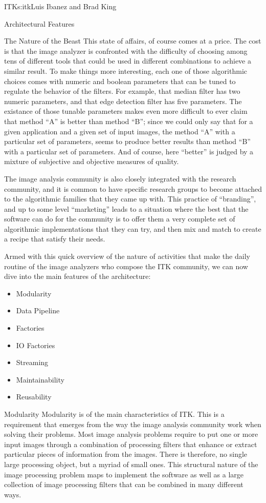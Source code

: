 \begin{aosachapter}{ITK}{s:itk}{Luis Ibanez and Brad King}
\begin{aosasect1}{Architectural Features}
\begin{aosasect2}{The Nature of the Beast}
This state of affairs, of course comes at a price. The cost is that the image
analyzer is confronted with the difficulty of choosing among tens of different
tools that could be used in different combinations to achieve a similar result.
To make things more interesting, each one of those algorithmic choices comes
with numeric and boolean parameters that can be tuned to regulate the behavior
of the filters. For example, that median filter has two numeric parameters, and
that edge detection filter has five parameters. The existance of those tunable
parameters makes even more difficult to ever claim that method ``A'' is better
than method ``B''; since we could only say that for a given application and a
given set of input images, the method ``A'' with a particular set of
parameters, seems to produce better results than method ``B'' with a particular
set of parameters. And of course, here ``better'' is judged by a mixture of
subjective and objective measures of quality.

The image analysis community is also closely integrated with the research
community, and it is common to have specific research groups to become attached
to the algorithmic families that they came up with. This practice of ``branding'',
and up to some level ``marketing'' leads to a situation where the best that the
software can do for the community is to offer them a very complete set of
algorithmic implementations that they can try, and then mix and match to create
a recipe that satisfy their needs.

Armed with this quick overview of the nature of activities that make the daily
routine of the image analyzers who compose the ITK community, we can now dive
into the main features of the architecture:

\begin{itemize}
\item Modularity
\item Data Pipeline
\item Factories
\item IO Factories
\item Streaming
\item Maintainability
\item Reusability
\end{itemize}

\end{aosasect2}

\begin{aosasect2}{Modularity}
Modularity is of the main characteristics of ITK. This is a requirement that
emerges from the way the image analysis community work when solving their
problems. Most image analysis problems require to put one or more input images
through a combination of processing filters that enhance or extract particular
pieces of information from the images. There is therefore, no single large
processing object, but a myriad of small ones. This structural nature of the
image processing problem maps to implement the software as well as a large
collection of image processing filters that can be combined in many different
ways.


\end{aosasect2}
\end{aosasect1}
\end{aosachapter}
